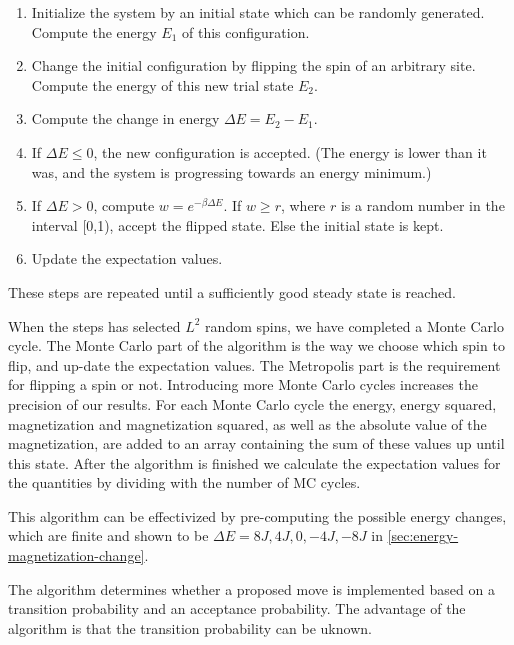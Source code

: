 \documentclass[../main.tex]{subfiles}
\begin{document}
\begin{enumerate}
    \item Initialize the system by an initial state which can be randomly generated. Compute the energy $E_1$ of this configuration. 
    \item Change the initial configuration by flipping the spin of an arbitrary site. Compute the energy of this new trial state $E_2$. 
    \item Compute the change in energy \ensuremath{\Delta E= E_2-E_1}.
    \item If \ensuremath{\Delta E\leq0}, the new configuration is accepted. (The energy is lower than it was, and the system is progressing towards an energy minimum.)
    \item If \ensuremath{\Delta E>0}, compute \ensuremath{w=e^{-\beta\Delta E}}. If \ensuremath{w\geq r}, where $r$ is a random number in the interval [0,1), accept the flipped state. Else the initial state is kept.
    \item Update the expectation values. 
\end{enumerate} These steps are repeated until a sufficiently good steady state is reached. 

When the steps has selected $L^2$ random spins, we have completed a Monte Carlo cycle. The Monte Carlo part of the algorithm is the way we choose which spin to flip,  and up-date the expectation values. The Metropolis part is the requirement for flipping a spin or not. Introducing more Monte Carlo cycles increases the precision of our results. For each Monte Carlo cycle the energy, energy squared, magnetization and magnetization squared, as well as the absolute value of the magnetization, are added to an array containing the sum of these values up until this state. After the algorithm is finished we calculate the expectation values for the quantities by dividing with the number of MC cycles.

This algorithm can be effectivized by pre-computing the possible energy changes, which are finite and shown to be \ensuremath{\Delta E= 8J, 4J, 0, -4J, -8J} in \cref{sec:energy-magnetization-change}. 

The algorithm determines whether a proposed move is implemented based on a transition probability and an acceptance probability. The advantage of the algorithm is that the transition probability can be uknown.
\end{document}
